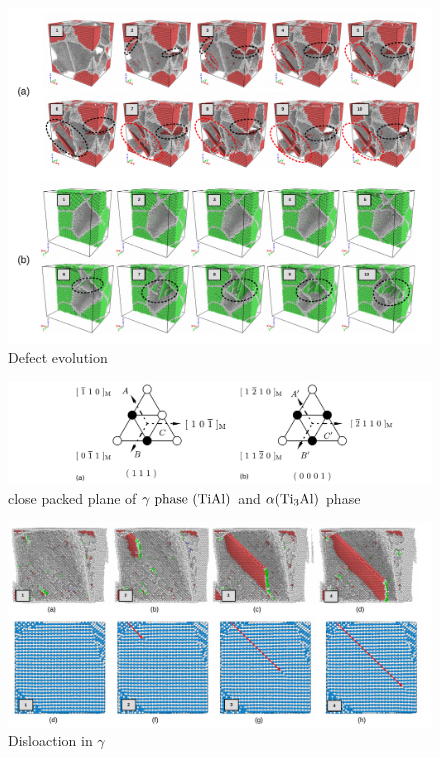 \documentclass[materials,article,submit,moreauthors,pdftex,10pt,a4paper]{Definitions/mdpi}
\begin{document}
\begin{figure}[ht] 
	\centering
	\includegraphics[width=1\linewidth]{img/def}
	\caption{Defect evolution}
	\label{fig:Defect}
\end{figure}


\begin{figure}[ht]
	\centering
	\includegraphics[width=1\linewidth]{img/plane}
	\caption{close packed plane of $\gamma\ \rm{phase}\ (\rm{TiAl})$ and $\alpha (\rm{Ti_3Al})$ phase }
	\label{fig:unit-cell}
\end{figure}

	\begin{figure}[ht]
		\centering
		\includegraphics[width=1\linewidth]{"img/disl-gamma"}
		\caption{Disloaction in $\gamma$}
		\label{fig:dis-alpha_2}
	\end{figure}
\end{document}
